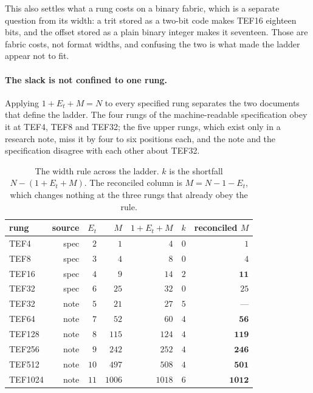 \documentclass[11pt]{article}
\theoremstyle{definition}
\begin{document}
This also settles what a rung costs on a binary fabric, which is a separate
question from its width: a trit stored as a two-bit code makes TEF16 eighteen
bits, and the offset stored as a plain binary integer makes it seventeen. Those
are fabric costs, not format widths, and confusing the two is what made the
ladder appear not to fit.

\paragraph{The slack is not confined to one rung.} Applying $1 + E_t + M = N$ to
every specified rung separates the two documents that define the ladder. The four
rungs of the machine-readable specification obey it at TEF4, TEF8 and TEF32;
the five upper rungs, which exist only in a research note, miss it by four to six
positions each, and the note and the specification disagree with each other about
TEF32.

\begin{table}[t]\centering
\caption{The width rule across the ladder. $k$ is the shortfall
$N - (1 + E_t + M)$. The reconciled column is $M = N - 1 - E_t$, which changes
nothing at the three rungs that already obey the rule.}
\label{tab:ladder-sweep}
\begin{tabular}{lrrrrrr}
\toprule
rung & source & $E_t$ & $M$ & $1{+}E_t{+}M$ & $k$ & reconciled $M$ \\
\midrule
TEF4    & spec & $2$  & $1$    & $4$    & $0$ & $1$ \\
TEF8    & spec & $3$  & $4$    & $8$    & $0$ & $4$ \\
TEF16   & spec & $4$  & $9$    & $14$   & $2$ & $\mathbf{11}$ \\
TEF32   & spec & $6$  & $25$   & $32$   & $0$ & $25$ \\
TEF32   & note & $5$  & $21$   & $27$   & $5$ & --- \\
TEF64   & note & $7$  & $52$   & $60$   & $4$ & $\mathbf{56}$ \\
TEF128  & note & $8$  & $115$  & $124$  & $4$ & $\mathbf{119}$ \\
TEF256  & note & $9$  & $242$  & $252$  & $4$ & $\mathbf{246}$ \\
TEF512  & note & $10$ & $497$  & $508$  & $4$ & $\mathbf{501}$ \\
TEF1024 & note & $11$ & $1006$ & $1018$ & $6$ & $\mathbf{1012}$ \\
\bottomrule
\end{tabular}
\end{table}
\end{document}
